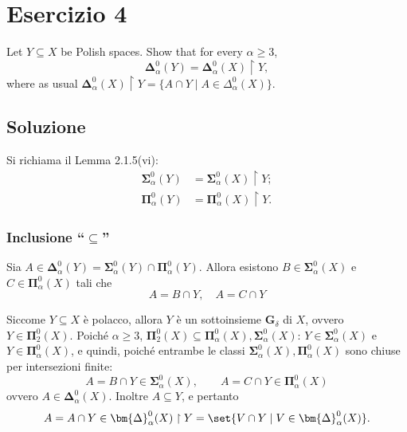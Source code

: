 \documentclass{article}
\newcommand{\1}{\mathds{1}}
\renewcommand{\href}[2]{#2}
\begin{document}
\section{Esercizio 4}
\label{sec:org8e08f1b}

Let \(Y \subseteq X\) be Polish spaces. Show that for every \(\alpha \geq 3\),
\[
\bm{\Delta}^0_\alpha(Y) = \bm{\Delta}^0_\alpha(X) \upharpoonright Y,
\]
where as usual \(\bm{\Delta}^0_\alpha(X) \upharpoonright Y = \{ A \cap Y \mid A \in \Delta^0_\alpha(X) \}\).
\subsection{Soluzione}
\label{sec:orgada97fe}

Si richiama il Lemma 2.1.5(vi):
\begin{align*}
\bm{\Sigma}^{0}_{\alpha}(Y) &= \bm{\Sigma}^{0}_{\alpha}(X)\upharpoonright Y;\\
\bm{\Pi}^{0}_{\alpha}(Y) &= \bm{\Pi}^{0}_{\alpha}(X)\upharpoonright Y.
\end{align*}
\subsubsection{Inclusione ``\(\subseteq\)''}
\label{sec:org5dee351}

Sia \(A \in \bm{\Delta}^{0}_{\alpha}(Y) = \bm{\Sigma}^{0}_{\alpha}(Y) \cap \bm{\Pi}^{0}_{\alpha}(Y)\). Allora esistono \(B \in \bm{\Sigma}^{0}_{\alpha}(X)\) e \(C \in \bm{\Pi}^{0}_{\alpha}(X)\) tali che
\begin{equation*}
A = B\cap Y,\quad A= C\cap Y
\end{equation*}

Siccome \(Y \subseteq X\) è polacco, \href{../../../../../../org/roam/20250306134632-caratterizzazione_dei_sottoinsiemi_polacchi_di_uno_spazio_polacco.org}{allora} \(Y\) è un \href{../../../../../../org/roam/20250304152026-sottoinsiemi_gdelta_e_fsigma.org}{sottoinsieme \(\bm{G}_{\delta}\)} di \(X\), ovvero \(Y \in \bm{\Pi}^{0}_{2}(X)\). Poiché \(\alpha\ge 3\), \(\bm{\Pi}^{0}_{2}(X) \subseteq \bm{\Pi}^{0}_{\alpha}(X), \bm{\Sigma}^{0}_{\alpha}(X)\): \(Y \in \bm{\Sigma}^{0}_{\alpha}(X)\) e \(Y \in \bm{\Pi}^{0}_{\alpha}(X)\), e quindi, poiché entrambe le classi \(\bm{\Sigma}_{\alpha}^{0}(X), \bm{\Pi}^{0}_{\alpha}(X)\) sono chiuse per intersezioni finite:
\begin{equation*}
A=B\cap Y \in \bm{\Sigma}^{0}_{\alpha}(X),\qquad A=C\cap Y \in \bm{\Pi}^{0}_{\alpha}(X)
\end{equation*}
ovvero \(A \in \bm{\Delta}^{0}_{\alpha}(X)\). Inoltre \(A \subseteq Y\), e pertanto
\begin{equation*}
A = A\cap Y \in \bm{\Delta}^{0}_{\alpha}(X)\upharpoonright Y = \set{V\cap Y\mid V \in \bm{\Delta}^{0}_{\alpha}(X)}.
\end{equation*}
\end{document}

